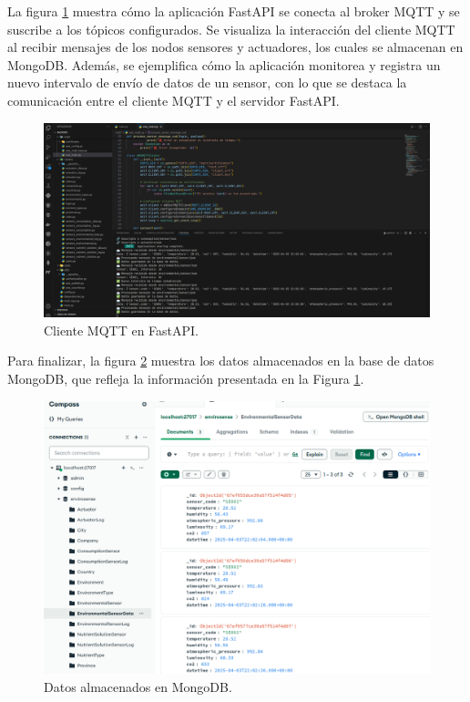 La figura \ref{fig:cliente_mqtt} muestra cómo la aplicación FastAPI se conecta
al broker MQTT y se suscribe a los tópicos configurados. Se visualiza la
interacción del cliente MQTT al recibir mensajes de los nodos sensores y
actuadores, los cuales se almacenan en MongoDB. Además, se ejemplifica cómo la
aplicación monitorea y registra un nuevo intervalo de envío de datos de un
sensor, con lo que se destaca la comunicación entre el cliente MQTT y el
servidor FastAPI.

\begin{figure}[H]
    \centering
    \includegraphics[width=.99\textwidth]{./Images/21.png}
    \caption{Cliente MQTT en FastAPI.}
    \label{fig:cliente_mqtt}
\end{figure}

Para finalizar, la figura \ref{fig:mongodb} muestra los datos almacenados en la
base de datos MongoDB, que refleja la información presentada en la Figura
\ref{fig:cliente_mqtt}.

\begin{figure}[H]
    \centering
    \includegraphics[width=.99\textwidth]{./Images/22.png}
    \caption{Datos almacenados en MongoDB.}
    \label{fig:mongodb}
\end{figure}

